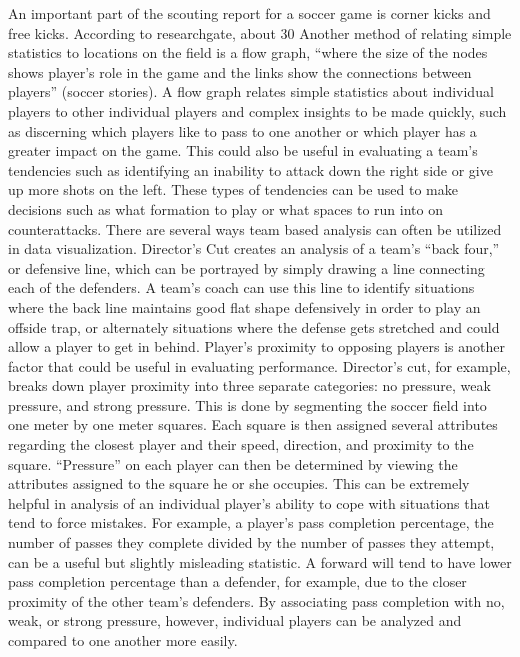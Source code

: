 \documentclass[sigconf]{acmart}
\begin{document}
	An important part of the scouting report for a soccer game is corner kicks and free kicks. According to researchgate,  about 30%
Another method of relating simple statistics to locations on the field is a flow graph, “where the size of the nodes shows player's role in the game and the links show the connections between players” (soccer stories). A flow graph relates simple statistics about individual players to other individual players and complex insights to be made quickly, such as discerning which players like to pass to one another or which player has a greater impact on the game. This could also be useful in evaluating a team’s tendencies such as identifying an inability to attack down the right side or give up more shots on the left. These types of tendencies can be used to make decisions such as what formation to play or what spaces to run into on counterattacks.
There are several ways team based analysis can often be utilized in data visualization. Director’s Cut creates an analysis of a team’s “back four,” or defensive line, which can be portrayed by simply drawing a line connecting each of the defenders. A team’s coach can use this line to identify situations where the back line maintains good flat shape defensively in order to play an offside trap, or alternately situations where the defense gets stretched and could allow a player to get in behind.
Player’s proximity to opposing players is another factor that could be useful in evaluating performance. Director’s cut, for example, breaks down player proximity into three separate categories: no pressure, weak pressure, and strong pressure. This is done by segmenting the soccer field into one meter by one meter squares. Each square is then assigned several attributes regarding the closest player and their speed, direction, and proximity to the square. “Pressure” on each player can then be determined by viewing the attributes assigned to the square he or she occupies. This can be extremely helpful in analysis of an individual player’s ability to cope with situations that tend to force mistakes. For example, a player’s pass completion percentage, the number of passes they complete divided by the number of passes they attempt, can be a useful but slightly misleading statistic. A forward will tend to have lower pass completion percentage than a defender, for example, due to the closer proximity of the other team’s defenders. By associating pass completion with no, weak, or strong pressure, however, individual players can be analyzed and compared to one another more easily.
\end{document}
